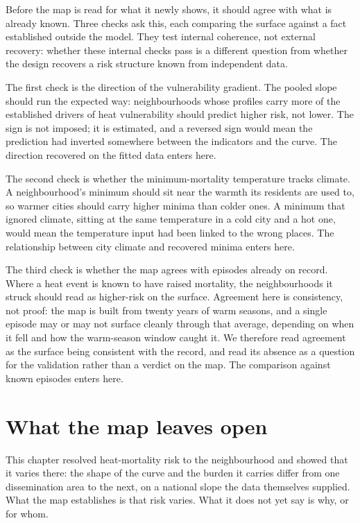 Before the map is read for what it newly shows, it should agree with what is already known. Three checks ask this, each comparing the surface against a fact established outside the model. They test internal coherence, not external recovery: whether these internal checks pass is a different question from whether the design recovers a risk structure known from independent data.

The first check is the direction of the vulnerability gradient. The pooled slope should run the expected way: neighbourhoods whose profiles carry more of the established drivers of heat vulnerability should predict higher risk, not lower. The sign is not imposed; it is estimated, and a reversed sign would mean the prediction had inverted somewhere between the indicators and the curve. The direction recovered on the fitted data enters here.

The second check is whether the minimum-mortality temperature tracks climate. A neighbourhood's minimum should sit near the warmth its residents are used to, so warmer cities should carry higher minima than colder ones. A minimum that ignored climate, sitting at the same temperature in a cold city and a hot one, would mean the temperature input had been linked to the wrong places. The relationship between city climate and recovered minima enters here.

The third check is whether the map agrees with episodes already on record. Where a heat event is known to have raised mortality, the neighbourhoods it struck should read as higher-risk on the surface. Agreement here is consistency, not proof: the map is built from twenty years of warm seasons, and a single episode may or may not surface cleanly through that average, depending on when it fell and how the warm-season window caught it. We therefore read agreement as the surface being consistent with the record, and read its absence as a question for the validation rather than a verdict on the map. The comparison against known episodes enters here.

\section{What the map leaves open}

This chapter resolved heat-mortality risk to the neighbourhood and showed that it varies there: the shape of the curve and the burden it carries differ from one dissemination area to the next, on a national slope the data themselves supplied. What the map establishes is that risk varies. What it does not yet say is why, or for whom.


